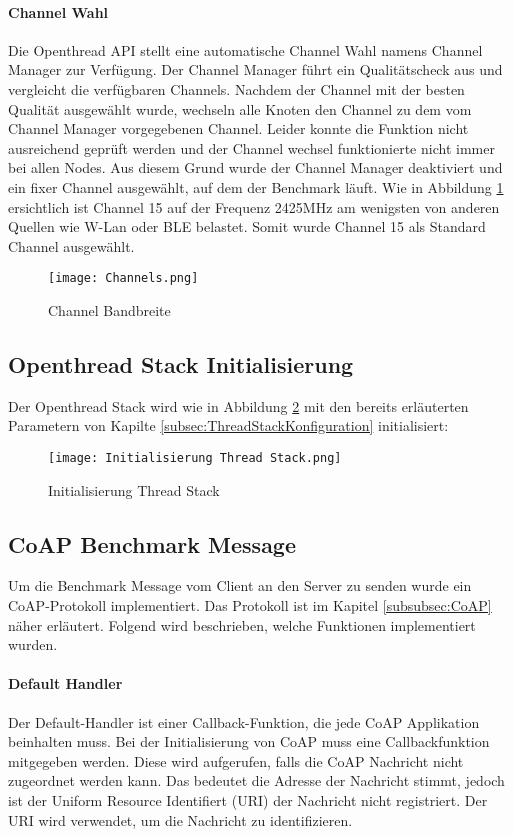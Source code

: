 \newpage
\paragraph{Channel Wahl}
Die Openthread API stellt eine automatische Channel Wahl namens Channel Manager zur Verfügung. Der Channel Manager führt ein Qualitätscheck aus und vergleicht die verfügbaren Channels. Nachdem der Channel mit der besten Qualität ausgewählt wurde, wechseln alle Knoten den Channel zu dem vom Channel Manager vorgegebenen Channel. Leider konnte die Funktion nicht ausreichend geprüft werden und der Channel wechsel funktionierte nicht immer bei allen Nodes. Aus diesem Grund wurde der Channel Manager deaktiviert und ein fixer Channel ausgewählt, auf dem der Benchmark läuft. Wie in Abbildung \ref{fig:ChannelBandbreite} ersichtlich ist Channel 15 auf der Frequenz 2425MHz am wenigsten von anderen Quellen wie W-Lan oder BLE belastet. Somit wurde Channel 15 als Standard Channel ausgewählt.
\begin{figure}[H]
	\centering
	\texttt{[image: Channels.png]}
	\caption{Channel Bandbreite \cite{zand_fig_nodate}}\label{fig:ChannelBandbreite}
\end{figure}

\subsection{Openthread Stack Initialisierung}\label{subsec:OpenthreadStackInitialisierun}
Der Openthread Stack wird wie in Abbildung \ref{fig:InitialisierungThreadStack} mit den bereits erläuterten Parametern von Kapilte \ref{subsec:ThreadStackKonfiguration} initialisiert:

\begin{figure}[H]
	\centering
	\texttt{[image: Initialisierung Thread Stack.png]}
	\caption{Initialisierung Thread Stack}\label{fig:InitialisierungThreadStack}
\end{figure}

\newpage
\subsection{CoAP Benchmark Message}\label{subsec:ThreadBenchmarkMessage}
Um die Benchmark Message vom Client an den Server zu senden wurde ein CoAP-Protokoll implementiert. Das Protokoll ist im Kapitel \ref{subsubsec:CoAP} näher erläutert. Folgend wird beschrieben, welche Funktionen implementiert wurden.

\paragraph{Default Handler} 
Der Default-Handler ist einer Callback-Funktion, die jede CoAP Applikation beinhalten muss. Bei der Initialisierung von CoAP muss eine Callbackfunktion mitgegeben werden. Diese wird aufgerufen, falls die CoAP Nachricht nicht zugeordnet werden kann. Das bedeutet die Adresse der Nachricht stimmt, jedoch ist der Uniform Resource Identifiert (URI) der Nachricht nicht registriert. Der URI wird verwendet, um die Nachricht zu identifizieren. 

